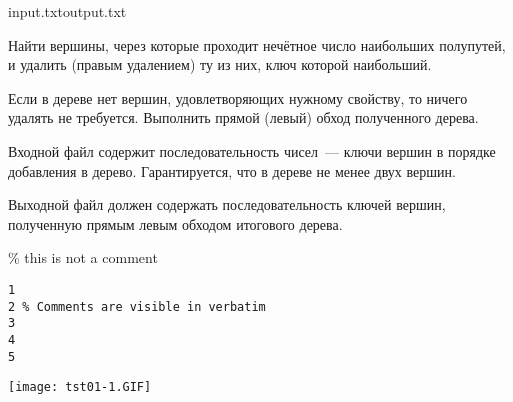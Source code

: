 
\begin{rawproblem}{input.txt}{output.txt}

Найти вершины, через которые проходит нечётное число наибольших полупутей, и
удалить (правым удалением) ту из них, ключ которой наибольший.

Если в дереве нет вершин, удовлетворяющих нужному свойству, то ничего
удалять не требуется. Выполнить прямой (левый) обход полученного дерева.

\InputFile

Входной файл содержит последовательность чисел~--- ключи вершин в порядке добавления в дерево. Гарантируется, что в дереве не менее двух вершин.

\OutputFile

Выходной файл должен содержать последовательность ключей вершин, полученную прямым левым обходом итогового дерева.

\Example

\% this is not a comment

\begin{verbatim}
1
2 % Comments are visible in verbatim
3
4
5
\end{verbatim}

\begin{example}%
%
\end{example}%
\begin{center}%
    \texttt{[image: tst01-1.GIF]}%
\end{center}%

\end{rawproblem}

